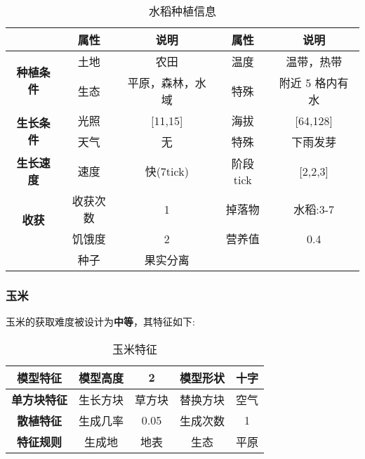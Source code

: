 \begin{table}[H]
    \centering
    \caption{水稻种植信息}
    \label{table:水稻种植信息}
    \setlength{\tabcolsep}{4mm}
    \begin{tabular}{c|cc|cc}
        \toprule
                                           & \textbf{属性} & \textbf{说明}    & \textbf{属性} & \textbf{说明}   \\
        \midrule
        \multirow{2}{*}{\textbf{种植条件}} & 土地          & 农田             & 温度          & 温带，热带      \\
                                           & 生态          & 平原，森林，水域 & 特殊          & 附近 5 格内有水 \\
        \midrule
        \multirow{2}{*}{\textbf{生长条件}} & 光照          & [11,15]          & 海拔          & [64,128]        \\
                                           & 天气          & 无               & 特殊          & 下雨发芽               \\
        \midrule
        \textbf{生长速度}                  & 速度          & 快(7tick)        & 阶段tick      & [2,2,3]         \\
        \midrule
        \multirow{2}{*}{\textbf{收获}}     & 收获次数      & 1                & 掉落物        & 水稻:3-7        \\
                                           & 饥饿度        & 2                & 营养值        & 0.4             \\
                                           & 种子 & 果实分离 \\
        \bottomrule
    \end{tabular}
\end{table}

\subsubsection{玉米}

玉米的获取难度被设计为\textbf{中等}，其特征如下:
\begin{table}[H]
    \centering
    \caption{玉米特征}
    \label{table:玉米特征}
    \setlength{\tabcolsep}{4mm}
    \begin{tabular}{c|cc|cc}
        \toprule
        \textbf{模型特征}   & 模型高度 & 2      & 模型形状 & 十字 \\
        \midrule
        \textbf{单方块特征} & 生长方块 & 草方块 & 替换方块 & 空气 \\
        \midrule
        \textbf{散植特征}   & 生成几率 & 0.05   & 生成次数 & 1    \\
        \midrule
        \textbf{特征规则}   & 生成地   & 地表   & 生态     & 平原 \\
        \bottomrule
    \end{tabular}
\end{table}


